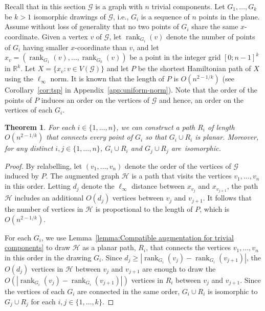 \documentclass{patmorin}
\newtheorem{theorem}{Theorem}[section]
\DeclareMathOperator{\rank}{rank}
\begin{document}
Recall that in this section $\mathcal G$ is a graph with $n$ trivial components.
Let $G_1, \ldots, G_k$ be $k>1$ isomorphic drawings of $\mathcal G$, i.e., $G_i$ is a sequence of $n$ points in the plane.
Assume without loss of generality that no two points of $G_i$ share the same $x$-coordinate.
Given a vertex $v$ of $\mathcal G$, let $\rank_{G_i}(v)$ denote the number of points of $G_i$ having smaller $x$-coordinate than $v$, and let $x_v = (\rank_{G_1}(v), \ldots, \rank_{G_k}(v))$ be a point in the integer grid $[0;n-1]^k$ in $\mathbb{R}^k$.  Let $X = \{x_v : v\in V(\mathcal G)\}$ and let $P$ be the shortest Hamiltonian path of $X$ using the $\ell_\infty$ norm.  It is known that the length of
$P$ is $O(n^{2-1/k})$ (see Corollary~\ref{cor:tsp} in Appendix~\ref{app:uniform-norm}).
Note that the order of the points of $P$ induces an order on the vertices of $\mathcal G$ and hence, an order on the vertices of each $G_i$.

\begin{theorem}\label{theorem:points}
For each $i\in \{1,\dots,n\}$, we can construct a path $R_i$ of length $O(n^{2-1/k})$ that connects every point of $G_i$ so that $G_i\cup R_i$ is planar. Moreover, for any distinct $i,j\in \{1,\dots,n\}$, $G_i\cup R_i$ and $G_j\cup R_j$ are~isomorphic.
\end{theorem}
\begin{proof}
By relabelling, let $(v_1, \ldots, v_n)$ denote the order of the vertices of $\mathcal{G}$ induced by $P$.  The augmented graph $\mathcal{H}$ is a path that visits the vertices $v_1,\ldots,v_n$ in this order. Letting $d_j$ denote the $\ell_\infty$ distance between $x_{v_j}$ and $x_{v_{j+1}}$, the path $\mathcal{H}$ includes an additional $O(d_j)$ vertices between $v_{j}$ and $v_{j+1}$.  It follows that the number of vertices
in $\mathcal{H}$ is proportional to the length of $P$, which is $O(n^{2-1/k})$.

For each $G_i$, we use Lemma~\ref{lemma:Compatible augmentation for trivial components} to draw $\mathcal{H}$ as a planar path, $R_i$,
that connects the vertices $v_1,\ldots,v_n$ in this order in the drawing $G_i$.
Since $d_j\ge |\rank_{G_i}(v_j) - \rank_{G_i}(v_{j+1})|$, the $O(d_j)$
vertices in $\mathcal{H}$ between $v_j$ and $v_{j+1}$ are enough to
draw the $O(|\rank_{G_i}(v_j) - \rank_{G_i}(v_{j+1})|)$ vertices in $R_i$
between $v_j$ and $v_{j+1}$.
Since the vertices of each $G_i$ are connected in the same order,
$G_i\cup R_i$ is isomorphic to $G_j\cup R_j$ for each $i,j\in\{1,\ldots,k\}$.
\end{proof}
\end{document}
